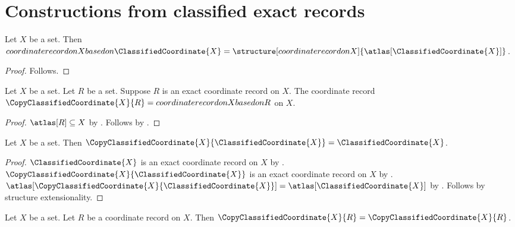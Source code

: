 

\section{Constructions from classified exact records}

\begin{proposition}\label{classified_bundle_reconstruction}
    Let $X$ be a set.
    Then $coordinate record on X based on \ClassifiedCoordinate{X}
        =\structure[coordinate record on X]{\atlas[\ClassifiedCoordinate{X}]}$.
\end{proposition}
\begin{proof}
    Follows.
\end{proof}

\begin{construction}\label{copy_classified_coordinate}
    Let $X$ be a set.
    Let $R$ be a set.
    Suppose $R$ is an exact coordinate record on $X$.
    The coordinate record $\CopyClassifiedCoordinate{X}{R}=
        coordinate record on X based on R$ on $X$.
\end{construction}
\begin{proof}
    $\atlas[R]\subseteq X$ by .
    Follows by .
\end{proof}

\begin{proposition}\label{copy_classified_bundle_identity}
    Let $X$ be a set.
    Then $\CopyClassifiedCoordinate{X}{\ClassifiedCoordinate{X}}=\ClassifiedCoordinate{X}$.
\end{proposition}
\begin{proof}
    $\ClassifiedCoordinate{X}$ is an exact coordinate record on $X$
        by .
    $\CopyClassifiedCoordinate{X}{\ClassifiedCoordinate{X}}$ is an exact coordinate record on $X$
        by .
    $\atlas[\CopyClassifiedCoordinate{X}{\ClassifiedCoordinate{X}}]=\atlas[\ClassifiedCoordinate{X}]$
        by .
    Follows by structure extensionality.
\end{proof}

\begin{proposition}\label{classified_copy_remains_total}
    Let $X$ be a set.
    Let $R$ be a coordinate record on $X$.
    Then $\CopyClassifiedCoordinate{X}{R}=\CopyClassifiedCoordinate{X}{R}$.
\end{proposition}
